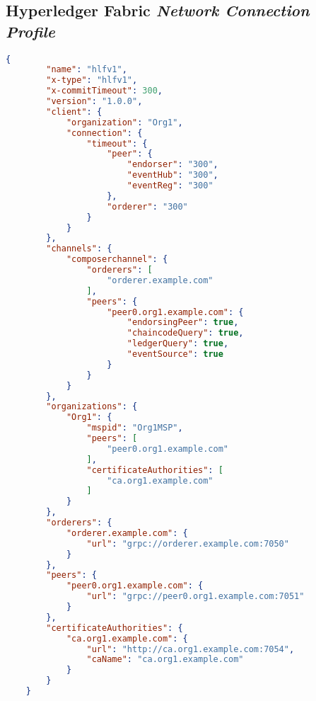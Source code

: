 \subsection{Hyperledger Fabric \textit{Network Connection Profile}} \label{lst:connection-profile}
\begin{lstlisting}[language=json]
    {
        "name": "hlfv1",
        "x-type": "hlfv1",
        "x-commitTimeout": 300,
        "version": "1.0.0",
        "client": {
            "organization": "Org1",
            "connection": {
                "timeout": {
                    "peer": {
                        "endorser": "300",
                        "eventHub": "300",
                        "eventReg": "300"
                    },
                    "orderer": "300"
                }
            }
        },
        "channels": {
            "composerchannel": {
                "orderers": [
                    "orderer.example.com"
                ],
                "peers": {
                    "peer0.org1.example.com": {
                        "endorsingPeer": true,
                        "chaincodeQuery": true,
                        "ledgerQuery": true,
                        "eventSource": true
                    }
                }
            }
        },
        "organizations": {
            "Org1": {
                "mspid": "Org1MSP",
                "peers": [
                    "peer0.org1.example.com"
                ],
                "certificateAuthorities": [
                    "ca.org1.example.com"
                ]
            }
        },
        "orderers": {
            "orderer.example.com": {
                "url": "grpc://orderer.example.com:7050"
            }
        },
        "peers": {
            "peer0.org1.example.com": {
                "url": "grpc://peer0.org1.example.com:7051"
            }
        },
        "certificateAuthorities": {
            "ca.org1.example.com": {
                "url": "http://ca.org1.example.com:7054",
                "caName": "ca.org1.example.com"
            }
        }
    }
\end{lstlisting}

